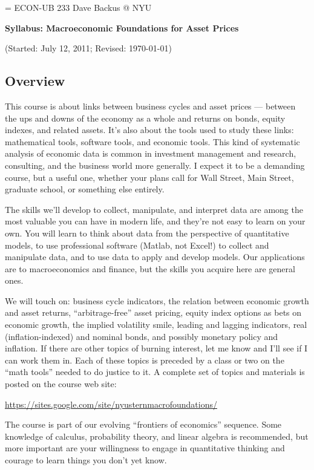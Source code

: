 \documentclass[11pt]{article}
\begin{document}
\parskip=\bigskipamount
\parindent=0.0in
\thispagestyle{empty}
{\large ECON-UB 233 \hfill Dave Backus @ NYU}

\bigskip\bigskip
\centerline{\Large \bf Syllabus:  Macroeconomic Foundations for Asset Prices}
\centerline{(Started: July 12, 2011; Revised: \today)}

\subsection*{Overview}

This course is about links between business cycles
and asset prices ---
between the ups and downs of the economy as a whole
and returns on bonds, equity indexes, and related assets.
It's also about the tools used to study these links:
mathematical tools, software tools, and economic tools.
This kind of systematic analysis of economic data is common in
investment management and research, consulting,
and the business world more generally.
I expect it to be a demanding course, but a useful one,
whether your plans call for Wall Street, Main Street,
graduate school, or something else entirely.


The skills we'll develop to collect, manipulate,
and interpret data
are among the most valuable you can have in modern life,
and they're not easy to learn on your own.
You will learn to think about data from the
perspective of quantitative models,
to use professional software
(Matlab, not Excel!) to collect and manipulate data,
and to use data to apply and develop models.
Our applications are to macroeconomics and finance,
but the skills you acquire here are general ones.


We will touch on:
business cycle indicators,
the relation between economic growth and asset returns,
``arbitrage-free'' asset pricing,
equity index options as bets on economic growth,
the implied volatility smile,
leading and lagging indicators,
real (inflation-indexed) and nominal bonds,
and possibly monetary policy and inflation.
If there are other topics of burning interest, let me know
and I'll see if I can work them in.
Each of these topics is preceded by a class or two on
the ``math tools'' needed to do justice to it.
A complete set of topics and materials is posted on
the course web site:

\bigskip
\centerline{\url{https://sites.google.com/site/nyusternmacrofoundations/}}

The course is part of our evolving ``frontiers of economics''
sequence.
Some knowledge of calculus, probability theory,
and linear algebra is recommended,
but more important are your willingness to engage in quantitative thinking
and courage to learn things you don't yet know.
\end{document}
